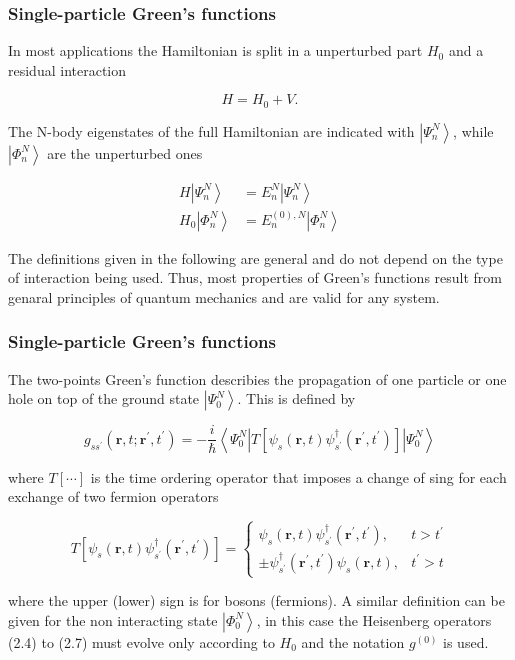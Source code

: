 \documentclass[compress]{beamer}
\begin{document}
\frame
{
\frametitle{Single-particle Green's functions}
\begin{small}
{\scriptsize
In most applications the Hamiltonian is split in a unperturbed part $H_{0}$ and a residual interaction

$$
H=H_{0}+V .
$$

The N-body eigenstates of the full Hamiltonian are indicated with $\left|\Psi_{n}^{N}\right\rangle$, while $\left|\Phi_{n}^{N}\right\rangle$ are the unperturbed ones

$$
\begin{aligned}
H\left|\Psi_{n}^{N}\right\rangle & =E_{n}^{N}\left|\Psi_{n}^{N}\right\rangle \\
H_{0}\left|\Phi_{n}^{N}\right\rangle & =E_{n}^{(0), N}\left|\Phi_{n}^{N}\right\rangle
\end{aligned}
$$

The definitions given in the following are general and do not depend on the type of interaction being used. Thus, most properties of Green's functions result from genaral principles of quantum mechanics and are valid for any system.
}
\end{small}
}


\frame
{
\frametitle{Single-particle Green's functions}
\begin{small}
{\scriptsize
The two-points Green's function describies the propagation of one particle or one hole on top of the ground state $\left|\Psi_{0}^{N}\right\rangle$. This is defined by

$$
g_{s s^{\prime}}\left(\mathbf{r}, t ; \mathbf{r}^{\prime}, t^{\prime}\right)=-\frac{i}{\hbar}\left\langle\Psi_{0}^{N}\left|T\left[\psi_{s}(\mathbf{r}, t) \psi_{s^{\prime}}^{\dagger}\left(\mathbf{r}^{\prime}, t^{\prime}\right)\right]\right| \Psi_{0}^{N}\right\rangle
$$

where $T[\cdots]$ is the time ordering operator that imposes a change of sing for each exchange of two fermion operators

$$
T\left[\psi_{s}(\mathbf{r}, t) \psi_{s^{\prime}}^{\dagger}\left(\mathbf{r}^{\prime}, t^{\prime}\right)\right]= \begin{cases}\psi_{s}(\mathbf{r}, t) \psi_{s^{\prime}}^{\dagger}\left(\mathbf{r}^{\prime}, t^{\prime}\right), & t>t^{\prime} \\ \pm \psi_{s^{\prime}}^{\dagger}\left(\mathbf{r}^{\prime}, t^{\prime}\right) \psi_{s}(\mathbf{r}, t), & t^{\prime}>t\end{cases}
$$

where the upper (lower) sign is for bosons (fermions). A similar definition can be given for the non interacting state $\left|\Phi_{0}^{N}\right\rangle$, in this case the Heisenberg operators (2.4) to (2.7) must evolve only according to $H_{0}$ and the notation $g^{(0)}$ is used.
}
\end{small}
}
\end{document}
